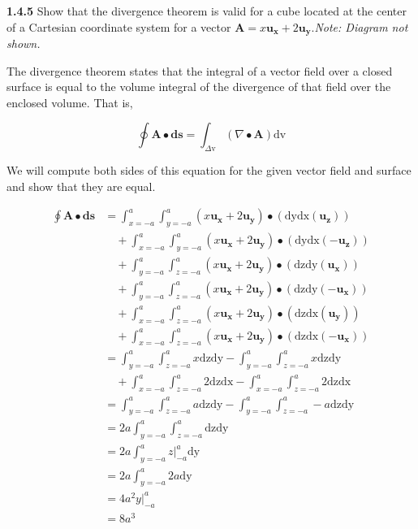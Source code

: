 \documentclass{article}
\begin{document}
\textbf{1.4.5} Show that the divergence theorem is valid for a cube located at the center of a Cartesian coordinate
system for a vector $\mathbf{A} = x\mathbf{u_x} + 2\mathbf{u_y}$.\@ \textit{Note: Diagram not shown.}

\vspace{24pt}

The divergence theorem states that the integral of a vector field over a closed surface is equal to the volume integral
of the divergence of that field over the enclosed volume. That is,

\begin{equation*}
	\oint \mathbf{A} \bullet \mathbf{ds} = \int_{\Delta \text{v}} (\nabla \bullet \mathbf{A})\text{dv}
\end{equation*}

We will compute both sides of this equation for the given vector field and surface and show that they are equal.

\begin{equation*}
	\begin{split}
		\oint \mathbf{A} \bullet \mathbf{ds} & = \int_{x=-a}^a \int_{y=-a}^a (x\mathbf{u_x} + 2\mathbf{u_y}) \bullet (\text{dydx}(\mathbf{u_z})) \\
		& \quad + \int_{x=-a}^a \int_{y=-a}^a (x\mathbf{u_x} + 2\mathbf{u_y}) \bullet (\text{dydx}(-\mathbf{u_z})) \\
		& \quad + \int_{y=-a}^a \int_{z=-a}^a (x\mathbf{u_x} + 2\mathbf{u_y}) \bullet (\text{dzdy}(\mathbf{u_x})) \\
		& \quad + \int_{y=-a}^a \int_{z=-a}^a (x\mathbf{u_x} + 2\mathbf{u_y}) \bullet (\text{dzdy}(-\mathbf{u_x})) \\
		& \quad + \int_{x=-a}^a \int_{z=-a}^a (x\mathbf{u_x} + 2\mathbf{u_y}) \bullet (\text{dzdx}(\mathbf{u_y})) \\
		& \quad + \int_{x=-a}^a \int_{z=-a}^a (x\mathbf{u_x} + 2\mathbf{u_y}) \bullet (\text{dzdx}(-\mathbf{u_x})) \\
		& = \int_{y=-a}^a \int_{z=-a}^a x \text{dzdy} - \int_{y=-a}^a \int_{z=-a}^a x \text{dzdy} \\
		& \quad + \int_{x=-a}^a \int_{z=-a}^a 2 \text{dzdx} - \int_{x=-a}^a \int_{z=-a}^a 2 \text{dzdx} \\
		& = \int_{y=-a}^a \int_{z=-a}^a a \text{dzdy} - \int_{y=-a}^a \int_{z=-a}^a -a \text{dzdy} \\
		& = 2a \int_{y=-a}^a \int_{z=-a}^a \text{dzdy} \\
		& = 2a \int_{y=-a}^a z \rvert_{-a}^a \text{dy} \\
		& = 2a \int_{y=-a}^a 2a \text{dy} \\
		& = 4a^2 y \rvert_{-a}^a \\
		& = 8a^3
	\end{split}
\end{equation*}
\end{document}
